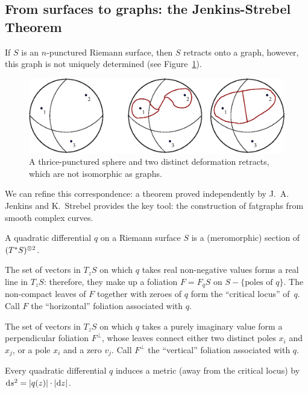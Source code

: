 \subsection{From surfaces to graphs: the Jenkins-Strebel Theorem}
\label{sec:strebel}
If $S$ is an $n$-punctured Riemann surface, then $S$ retracts onto a
graph, however, this graph is not uniquely determined (see
Figure~\ref{fig:sphere-retracts}).
\begin{figure}[bt]
  \centering\includegraphics[width=\textwidth]{sfera3}
  \caption{A thrice-punctured sphere and two distinct deformation
    retracts, which are not isomorphic as graphs.}
  \label{fig:sphere-retracts}
\end{figure}
We can refine this correspondence: a theorem proved independently by
J.~A. Jenkins \cite{jenkins;annals} and K.~Strebel
\cite{strebel;quadratic-differentials;1983} provides the key tool: the
construction of fatgraphs from smooth complex curves.

\begin{definition}
  A quadratic differential $q$ on a Riemann surface $S$ is a
  (meromorphic) section of $(T^*S)\sp{\otimes 2}$.
\end{definition}
The set of vectors in $T_zS$ on which $q$ takes real non-negative
values forms a real line in $T_zS$: therefore, they make up a
foliation $F = F_qS$ on $S - \{\text{poles of $q$}\}$. The non-compact
leaves of $F$ together with zeroes of $q$ form the ``critical locus''
of~$q$.  Call $F$ the ``horizontal'' foliation associated with $q$.

The set of vectors in $T_zS$ on which $q$ takes a purely imaginary
value form a perpendicular foliation $F^\perp$, whose leaves connect
either two distinct poles $x_i$ and $x_j$, or a pole $x_i$ and a zero
$v_j$.  Call $F^\perp$ the ``vertical'' foliation associated with $q$.

Every quadratic differential $q$ induces a metric (away from the
critical locus) by $\mathrm{d} s^2 = \lvert q(z)\rvert \cdot \lvert\mathrm{d} z\rvert$.

